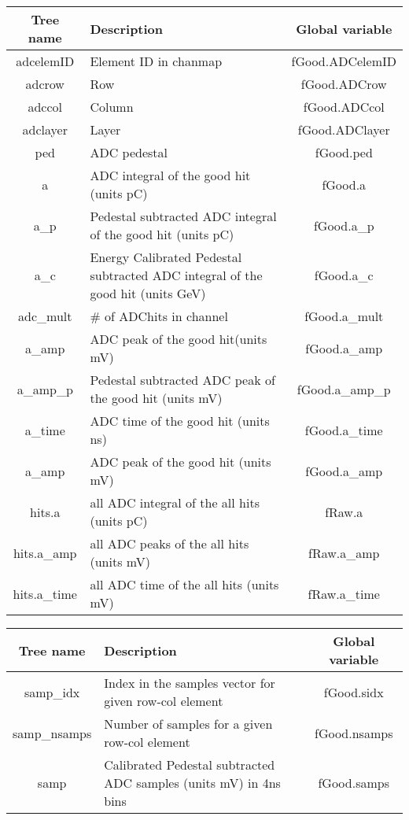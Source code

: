 \documentclass[11pt]{article}
\begin{document}
\begin{center}
\begin{tabularx}{\textwidth}{|c|X|c|}
	\hline 
Tree name	& Description &  Global variable\\ 
\hline 
adcelemID 	& Element ID in chanmap  & fGood.ADCelemID  \\ 
\hline 
adcrow 	& Row   & fGood.ADCrow  \\ 
\hline
adccol 	& Column   & fGood.ADCcol \\
\hline 
adclayer	& Layer   & fGood.ADClayer \\ 
\hline 
ped	& ADC pedestal  & fGood.ped \\ 
	\hline 
a	& ADC integral of the good hit (units pC)  &fGood.a  \\ 
	\hline 
a\_p	& Pedestal subtracted ADC integral of the good hit  (units pC) & fGood.a\_p \\ 
	\hline 
a\_c	& Energy Calibrated Pedestal subtracted ADC integral of the good hit (units GeV) & fGood.a\_c \\ 
\hline 
adc\_mult & \# of ADChits in channel & fGood.a\_mult \\
	\hline 
a\_amp	& ADC peak of the good hit(units mV)  &fGood.a\_amp  \\ 
\hline 
a\_amp\_p	& Pedestal subtracted ADC peak of the good hit (units mV) & fGood.a\_amp\_p \\ 
\hline 
a\_time	& ADC time of the good hit  (units ns)  &fGood.a\_time  \\ 
\hline 
a\_amp	& ADC peak of the good hit (units mV)  &fGood.a\_amp  \\ 
\hline 
		\hline 
hits.a 	&  all ADC integral of the all hits  (units pC)  &fRaw.a  \\ 
\hline 
hits.a\_amp 	&  all ADC peaks of the all hits  (units mV)  &fRaw.a\_amp  \\ 
\hline 
hits.a\_time	&  all ADC time of the all hits (units mV)  &fRaw.a\_time  \\ 
\hline 
\end{tabularx} 
\end{center}




\begin{center}
	\begin{tabularx}{\textwidth}{|c|X|c|}
	\hline 
	Tree name	& Description &  Global variable\\ 
	\hline 
	samp\_idx 	& Index in the samples vector for given row-col element &fGood.sidx  \\ 
	\hline 
	samp\_nsamps	& Number of samples for a given row-col element &fGood.nsamps  \\ 
\hline 
	samp 	& Calibrated Pedestal subtracted ADC samples (units mV) in 4ns bins &fGood.samps  \\ 
\hline 
\end{tabularx} 
\end{center}
\end{document}
